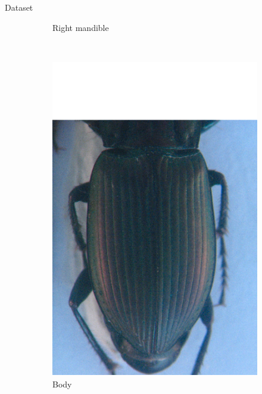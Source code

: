 \documentclass[10pt]{beamer}
\begin{document}
\begin{frame}[c]{Dataset}
\begin{figure}[htbp]
\begin{subfigure}[t]{0.22\textwidth}
        			\caption{\footnotesize{Right mandible}}
        			\label{figsub22}
    			\end{subfigure}
    			~ 
    			\begin{subfigure}[t]{0.22\textwidth}
        			\centering
        			\includegraphics[scale=.16]{images/elytre2}
        			\caption{\footnotesize{Body}}
        			\label{figsub22}
    			\end{subfigure}
    			~ 
    			\begin{subfigure}[t]{0.22\textwidth}
        			\centering

\end{subfigure}
\end{figure}
\end{frame}
\end{document}

